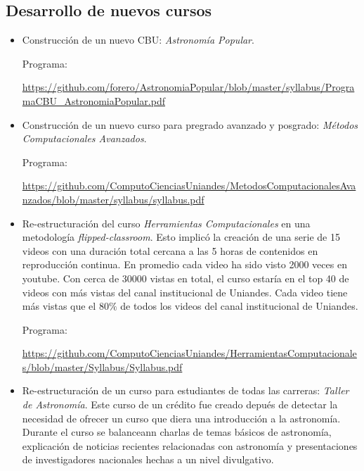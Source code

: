 \documentclass{article}
\begin{document}
\subsection{Desarrollo de nuevos cursos}
\begin{itemize}
\item Construcci\'on de un nuevo CBU: \emph{Astronom\'ia Popular}.

Programa:

\url{https://github.com/forero/AstronomiaPopular/blob/master/syllabus/ProgramaCBU_AstronomiaPopular.pdf}

\item Construcci\'on de un nuevo curso para pregrado avanzado y
  posgrado: \emph{M\'etodos Computacionales Avanzados}.

Programa:

\url{https://github.com/ComputoCienciasUniandes/MetodosComputacionalesAvanzados/blob/master/syllabus/syllabus.pdf}
\item Re-estructuraci\'on del curso \emph{Herramientas Computacionales} en
  una metodolog\'ia \emph{flipped-classroom}.
Esto implic\'o la creaci\'on de una serie de 15 videos con una duraci\'on total cercana a las 5 horas de contenidos en reproducci\'on continua.
En promedio cada video ha sido visto 2000 veces en youtube.
Con cerca de 30000 vistas en total, el curso estaría en el top 40 de videos con más vistas del canal institucional de Uniandes.
Cada video tiene más vistas que el 80$\%$ de todos los videos del canal
institucional de Uniandes.

Programa:

\url{https://github.com/ComputoCienciasUniandes/HerramientasComputacionales/blob/master/Syllabus/Syllabus.pdf}    

\item Re-estructuraci\'on de un curso para estudiantes de todas las
  carreras: \emph{Taller de Astronom\'ia}. 
Este curso de un cr\'edito fue creado depu\'es de detectar la
necesidad de ofrecer un curso que diera una introducci\'on a la
astronom\'ia. 
Durante el curso se balanceann charlas de temas b\'asicos de
astronom\'ia, explicaci\'on de noticias recientes relacionadas con
astronom\'ia y presentaciones de investigadores nacionales hechas a un
nivel divulgativo. 

\end{itemize}
\end{document}
